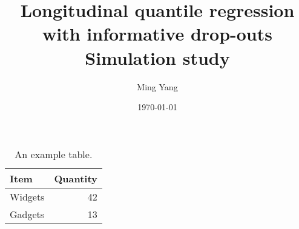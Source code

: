 \documentclass{article}
\begin{document}
\title{\textsf{Longitudinal quantile regression with informative drop-outs \cite{farcomeni2014longitudinal}\\ Simulation study}}
\author{\textsf{Ming Yang}}
\date{\today}
\maketitle



\begin{table}[H]
\centering
\begin{tabular}{l|r}
Item & Quantity \\\hline
Widgets & 42 \\
Gadgets & 13
\end{tabular}
\caption{\label{tab:widgets}An example table.}
\end{table}

























%
%
%
%

\end{document}
